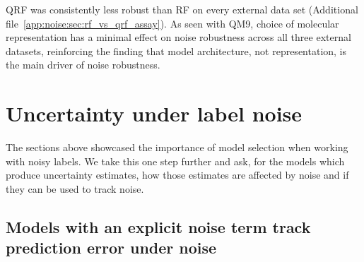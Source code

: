QRF was consistently less robust than RF on every external data set (Additional file~\ref{app:noise:sec:rf_vs_qrf_assay}). As seen with QM9, choice of molecular representation has a minimal effect on noise robustness across all three external datasets, reinforcing the finding that model architecture, not representation, is the main driver of noise robustness. 

\section{Uncertainty under label noise}\label{sec:uq}

The sections above showcased the importance of model selection when working with noisy labels. We take this one step further and ask, for the models which produce uncertainty estimates, how those estimates are affected by noise and if they can be used to track noise. 

\subsection{Models with an explicit noise term track prediction error under noise}

